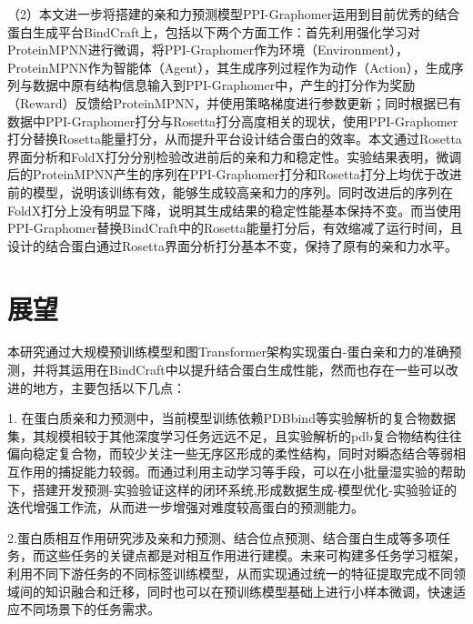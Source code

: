 （2）本文进一步将搭建的亲和力预测模型PPI-Graphomer运用到目前优秀的结合蛋白生成平台BindCraft上，包括以下两个方面工作：首先利用强化学习对ProteinMPNN进行微调，将PPI-Graphomer作为环境（Environment），ProteinMPNN作为智能体（Agent），其生成序列过程作为动作（Action），生成序列与数据中原有结构信息输入到PPI-Graphomer中，产生的打分作为奖励（Reward）反馈给ProteinMPNN，并使用策略梯度进行参数更新；同时根据已有数据中PPI-Graphomer打分与Rosetta打分高度相关的现状，使用PPI-Graphomer打分替换Rosetta能量打分，从而提升平台设计结合蛋白的效率。本文通过Rosetta界面分析和FoldX打分分别检验改进前后的亲和力和稳定性。实验结果表明，微调后的ProteinMPNN产生的序列在PPI-Graphomer打分和Rosetta打分上均优于改进前的模型，说明该训练有效，能够生成较高亲和力的序列。同时改进后的序列在FoldX打分上没有明显下降，说明其生成结果的稳定性能基本保持不变。而当使用PPI-Graphomer替换BindCraft中的Rosetta能量打分后，有效缩减了运行时间，且设计的结合蛋白通过Rosetta界面分析打分基本不变，保持了原有的亲和力水平。



\section{展望}
本研究通过大规模预训练模型和图Transformer架构实现蛋白-蛋白亲和力的准确预测，并将其运用在BindCraft中以提升结合蛋白生成性能，然而也存在一些可以改进的地方，主要包括以下几点：

1. 在蛋白质亲和力预测中，当前模型训练依赖PDBbind等实验解析的复合物数据集，其规模相较于其他深度学习任务远远不足，且实验解析的pdb复合物结构往往偏向稳定复合物，而较少关注一些无序区形成的柔性结构，同时对瞬态结合等弱相互作用的捕捉能力较弱。而通过利用主动学习等手段，可以在小批量湿实验的帮助下，搭建开发预测-实验验证这样的闭环系统,形成数据生成-模型优化-实验验证的迭代增强工作流，从而进一步增强对难度较高蛋白的预测能力。

2.蛋白质相互作用研究涉及亲和力预测、结合位点预测、结合蛋白生成等多项任务，而这些任务的关键点都是对相互作用进行建模。未来可构建多任务学习框架，利用不同下游任务的不同标签训练模型，从而实现通过统一的特征提取完成不同领域间的知识融合和迁移，同时也可以在预训练模型基础上进行小样本微调，快速适应不同场景下的任务需求。


